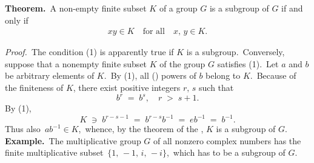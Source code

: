 \documentclass[12pt]{article}
\theoremstyle{definition}
\begin{document}
\textbf{Theorem.}\, A non-empty finite subset $K$ of a group $G$ is a subgroup of $G$ if and only if 
\begin{align}
xy \in K \quad\mbox{for all}\quad x,\,y \in K.
\end{align}


\emph{Proof.}\, The condition (1) is apparently true if $K$ is a subgroup.\, Conversely, suppose that a nonempty finite subset $K$ of the group $G$ satisfies (1).\, Let $a$ and $b$ be arbitrary elements of $K$.\, By (1), all () powers of $b$ belong to $K$.\, Because of the finiteness of $K$, there exist positive integers $r,\,s$ such that
$$b^r \;=\; b^s, \quad r \;>\; s\!+\!1.$$
By (1), 
$$K \;\ni\; b^{r-s-1} \;=\; b^{r-s}b^{-1} \;=\; eb^{-1} \;=\; b^{-1}.$$
Thus also\, $ab^{-1} \in K$,\, whence, by the theorem of the , $K$ is a subgroup of $G$.\\


\textbf{Example.}\, The multiplicative group $G$ of all nonzero complex numbers has the finite multiplicative subset 
\,$\{1,\,-1,\,i,\,-i\}$,\, which has to be a subgroup of $G$.
\end{document}

